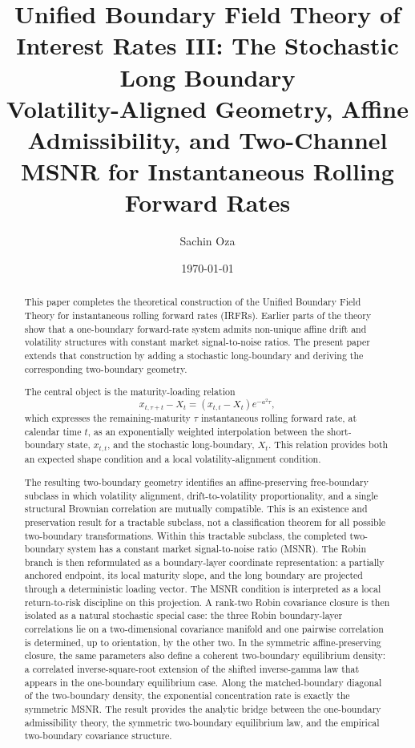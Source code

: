 \documentclass[11pt]{article}
\title{Unified Boundary Field Theory of Interest Rates III: The Stochastic Long Boundary \\\large Volatility-Aligned Geometry, Affine Admissibility, and Two-Channel MSNR for Instantaneous Rolling Forward Rates}
\author{Sachin Oza}
\date{\today}
\numberwithin{equation}{section}
\begin{document}
\maketitle

\begin{abstract}
This paper completes the theoretical construction of the Unified Boundary Field Theory for instantaneous rolling forward rates (IRFRs). Earlier parts of the theory show that a one-boundary forward-rate system admits non-unique affine drift and volatility structures with constant market signal-to-noise ratios. The present paper extends that construction by adding a stochastic long-boundary and deriving the corresponding two-boundary geometry.

The central object is the maturity-loading relation
\[
x_{t,\tau+t}-X_t
=
\left(x_{t,t}-X_t\right)e^{-a^2\tau},
\]
which expresses the remaining-maturity \(\tau\) instantaneous rolling forward rate, at calendar time \(t\), as an exponentially weighted interpolation between the short-boundary state, \(x_{t,t}\), and the stochastic long-boundary, \(X_t\). This relation provides both an expected shape condition and a local volatility-alignment condition.

The resulting two-boundary geometry identifies an affine-preserving free-boundary subclass in which volatility alignment, drift-to-volatility proportionality, and a single structural Brownian correlation are mutually compatible. This is an existence and preservation result for a tractable subclass, not a classification theorem for all possible two-boundary transformations. Within this tractable subclass, the completed two-boundary system has a constant market signal-to-noise ratio (MSNR). The Robin branch is then reformulated as a boundary-layer coordinate representation: a partially anchored endpoint, its local maturity slope, and the long boundary are projected through a deterministic loading vector. The MSNR condition is interpreted as a local return-to-risk discipline on this projection. A rank-two Robin covariance closure is then isolated as a natural stochastic special case: the three Robin boundary-layer correlations lie on a two-dimensional covariance manifold and one pairwise correlation is determined, up to orientation, by the other two. In the symmetric affine-preserving closure, the same parameters also define a coherent two-boundary equilibrium density: a correlated inverse-square-root extension of the shifted inverse-gamma law that appears in the one-boundary equilibrium case. Along the matched-boundary diagonal of the two-boundary density, the exponential concentration rate is exactly the symmetric MSNR. The result provides the analytic bridge between the one-boundary admissibility theory, the symmetric two-boundary equilibrium law, and the empirical two-boundary covariance structure.
\end{abstract}
\end{document}
